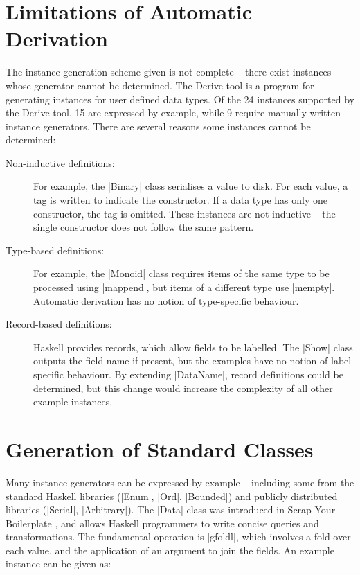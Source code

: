 \documentclass{llncs}
\begin{document}
\section{Limitations of Automatic Derivation}
\label{sec:automatic_failure}

The instance generation scheme given is not complete -- there exist instances whose generator cannot be determined. The Derive tool \cite{derive} is a program for generating instances for user defined data types. Of the 24 instances supported by the Derive tool, 15 are expressed by example, while 9 require manually written instance generators. There are several reasons some instances cannot be determined:

\begin{description}

\item[Non-inductive definitions:] For example, the |Binary| class serialises a value to disk. For each value, a tag is written to indicate the constructor. If a data type has only one constructor, the tag is omitted. These instances are not inductive -- the single constructor does not follow the same pattern.

\item[Type-based definitions:] For example, the |Monoid| class requires items of the same type to be processed using |mappend|, but items of a different type use |mempty|. Automatic derivation has no notion of type-specific behaviour.

\item [Record-based definitions:] Haskell provides records, which allow fields to be labelled. The |Show| class outputs the field name if present, but the examples have no notion of label-specific behaviour. By extending |DataName|, record definitions could be determined, but this change would increase the complexity of all other example instances.

\end{description}

\section{Generation of Standard Classes}
\label{sec:automatic_success}

Many instance generators can be expressed by example -- including some from the standard Haskell libraries (|Enum|, |Ord|, |Bounded|) and publicly distributed libraries (|Serial|, |Arbitrary|). The |Data| class was introduced in Scrap Your Boilerplate \cite{lammel:syb}, and allows Haskell programmers to write concise queries and transformations. The fundamental operation is |gfoldl|, which involves a fold over each value, and the application of an argument to join the fields. An example instance can be given as:
\end{document}
